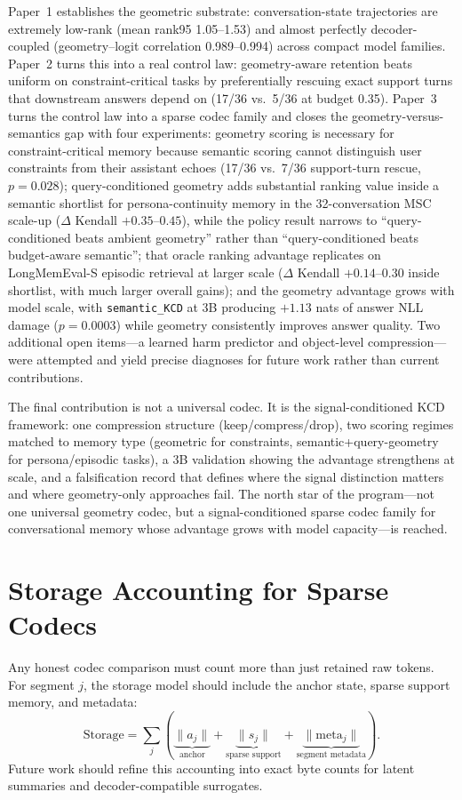 \documentclass[conference]{IEEEtran}
\begin{document}
Paper~1 establishes the geometric substrate: conversation-state trajectories are extremely low-rank (mean rank95 1.05--1.53) and almost perfectly decoder-coupled (geometry--logit correlation 0.989--0.994) across compact model families. Paper~2 turns this into a real control law: geometry-aware retention beats uniform on constraint-critical tasks by preferentially rescuing exact support turns that downstream answers depend on (17/36 vs.\ 5/36 at budget 0.35). Paper~3 turns the control law into a sparse codec family and closes the geometry-versus-semantics gap with four experiments: geometry scoring is necessary for constraint-critical memory because semantic scoring cannot distinguish user constraints from their assistant echoes (17/36 vs.\ 7/36 support-turn rescue, $p=0.028$); query-conditioned geometry adds substantial ranking value inside a semantic shortlist for persona-continuity memory in the 32-conversation MSC scale-up ($\Delta$ Kendall $+0.35$--$0.45$), while the policy result narrows to ``query-conditioned beats ambient geometry'' rather than ``query-conditioned beats budget-aware semantic''; that oracle ranking advantage replicates on LongMemEval-S episodic retrieval at larger scale ($\Delta$ Kendall $+0.14$--$0.30$ inside shortlist, with much larger overall gains); and the geometry advantage grows with model scale, with \texttt{semantic\_KCD} at 3B producing $+1.13$ nats of answer NLL damage ($p=0.0003$) while geometry consistently improves answer quality. Two additional open items---a learned harm predictor and object-level compression---were attempted and yield precise diagnoses for future work rather than current contributions.

The final contribution is not a universal codec. It is the signal-conditioned KCD framework: one compression structure (keep/compress/drop), two scoring regimes matched to memory type (geometric for constraints, semantic+query-geometry for persona/episodic tasks), a 3B validation showing the advantage strengthens at scale, and a falsification record that defines where the signal distinction matters and where geometry-only approaches fail. The north star of the program---not one universal geometry codec, but a signal-conditioned sparse codec family for conversational memory whose advantage grows with model capacity---is reached.

\appendices
\section{Storage Accounting for Sparse Codecs}
Any honest codec comparison must count more than just retained raw tokens. For segment $j$, the storage model should include the anchor state, sparse support memory, and metadata:
\begin{equation}
\mathrm{Storage} = \sum_j \left(
\underbrace{\lVert a_j \rVert}_{\text{anchor}}
+ \underbrace{\lVert s_j \rVert}_{\text{sparse support}}
+ \underbrace{\lVert \mathrm{meta}_j \rVert}_{\text{segment metadata}}
\right).
\end{equation}
Future work should refine this accounting into exact byte counts for latent summaries and decoder-compatible surrogates.
\end{document}
